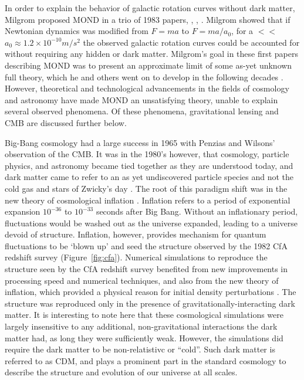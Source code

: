In order to explain the behavior of galactic rotation curves without dark matter, Milgrom proposed \ac{MOND} in a trio of 1983 papers, \cite{Milgrom1983_1}, \cite{Milgrom1983_2}, \cite{Milgrom1983_3}. Milgrom showed that if Newtonian dynamics was modified from $F = ma$ to $F= ma / a_{0}$, for a $<<$ $a_{0} \approx 1.2 \times 10^{-10} m/s^{2}$ the observed galactic rotation curves could be accounted for without requiring any hidden or dark matter. Milgrom's goal in these first papers describing \ac{MOND} was to present an approximate limit of some as-yet unknown full theory, which he and others went on to develop in the following decades \cite{Bertone2016}. However, theoretical and technological advancements in the fields of cosmology and astronomy have made \ac{MOND} an unsatisfying theory, unable to explain several observed phenomena. Of these phenomena, gravitational lensing and \ac{CMB} are discussed further below.

Big-Bang cosmology had a large success in 1965 with Penzias and Wilsons' observation of the \ac{CMB}. It was in the 1980's however, that cosmology, particle physics, and astronomy became tied together as they are understood today, and dark matter came to refer to an as yet undiscovered particle species and not the cold gas and stars of Zwicky's day \cite{Bertone2016}. The root of this paradigm shift was in the new theory of cosmological inflation \cite{Bertone2016}. Inflation refers to a period of exponential expansion $10^{-36}$ to $10^{-33}$ seconds after Big Bang. Without an inflationary period, fluctuations would be washed out as the universe expanded, leading to a universe devoid of structure. Inflation, however, provides mechanism for quantum fluctuations to be `blown up' and seed the structure observed by the 1982 CfA redshift survey (Figure~\ref{fig:cfa}). Numerical simulations to reproduce the structure seen by the CfA redshift survey benefited from new improvements in processing speed and numerical techniques, and also from the new theory of inflation, which provided a physical reason for initial density perturbations \cite{Bertone2016}. The structure was reproduced only in the presence of gravitationally-interacting dark matter. It is interesting to note here that these cosmological simulations were largely insensitive to any additional, non-gravitational interactions the dark matter had, as long they were sufficiently weak. However, the simulations did require the dark matter to be non-relatistivc or ``cold''. Such dark matter is referred to as \ac{CDM}, and plays a prominent part in the standard cosmology to describe the structure and evolution of our universe at all scales.  

